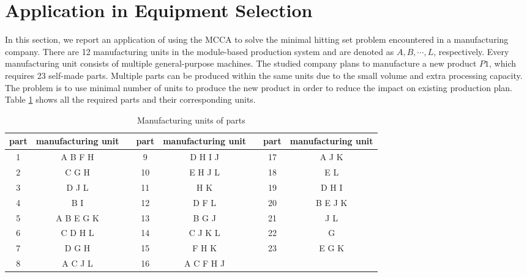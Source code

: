 \section{Application in Equipment Selection}
In this section, we report an application of using the MCCA to solve the minimal hitting set problem encountered in a manufacturing company.
There are 12 manufacturing units in the module-based production system and are denoted as $A, B, \cdots, L$, respectively.
Every manufacturing unit consists of multiple general-purpose machines.
The studied company plans to manufacture a new product $P1$, which requires 23 self-made parts.
Multiple parts can be produced within the same units due to the small volume and extra processing capacity.
The problem is to use minimal number of units to produce the new product in order to reduce the impact on existing production plan.
Table \ref{tab:tab4} shows all the required parts and their corresponding units.


\begin{table}[h!]
	\begin{center}
		\caption{Manufacturing units of parts}
		\label{tab:tab4}
		\begin{tabular}{cc|c|cc|c|cc}
			\hline
			part & manufacturing unit && part & manufacturing unit && part & manufacturing unit \\
			\hline
			1 & A B F H   && 9  & D H I J   && 17 & A J K \\
			2 & C G H     && 10 & E H J L   && 18 & E L \\
			3 & D J L     && 11 & H K       && 19 & D H I \\
			4 & B I       && 12 & D F L     && 20 & B E J K \\
			5 & A B E G K && 13 & B G J     && 21 & J L \\
			6 & C D H L   && 14 & C J K L   && 22 & G \\
			7 & D G H     && 15 & F H K     && 23 & E G K \\
			8 & A C J L   && 16 & A C F H J &&    & \\
			\hline
		\end{tabular}
	\end{center}
\end{table}


